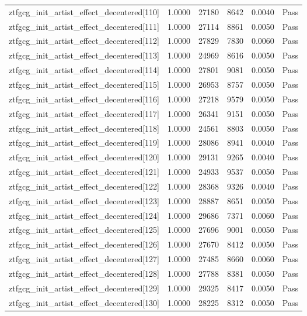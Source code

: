 \begin{table}[htbp]
\begin{tabular}{llrrll}
ztfgcg\_init\_artist\_effect\_decentered[110] & 1.0000 & 27180 & 8642 & 0.0040 & Pass \\
ztfgcg\_init\_artist\_effect\_decentered[111] & 1.0000 & 27114 & 8861 & 0.0050 & Pass \\
ztfgcg\_init\_artist\_effect\_decentered[112] & 1.0000 & 27829 & 7830 & 0.0060 & Pass \\
ztfgcg\_init\_artist\_effect\_decentered[113] & 1.0000 & 24969 & 8616 & 0.0050 & Pass \\
ztfgcg\_init\_artist\_effect\_decentered[114] & 1.0000 & 27801 & 9081 & 0.0050 & Pass \\
ztfgcg\_init\_artist\_effect\_decentered[115] & 1.0000 & 26953 & 8757 & 0.0050 & Pass \\
ztfgcg\_init\_artist\_effect\_decentered[116] & 1.0000 & 27218 & 9579 & 0.0050 & Pass \\
ztfgcg\_init\_artist\_effect\_decentered[117] & 1.0000 & 26341 & 9151 & 0.0050 & Pass \\
ztfgcg\_init\_artist\_effect\_decentered[118] & 1.0000 & 24561 & 8803 & 0.0050 & Pass \\
ztfgcg\_init\_artist\_effect\_decentered[119] & 1.0000 & 28086 & 8941 & 0.0040 & Pass \\
ztfgcg\_init\_artist\_effect\_decentered[120] & 1.0000 & 29131 & 9265 & 0.0040 & Pass \\
ztfgcg\_init\_artist\_effect\_decentered[121] & 1.0000 & 24933 & 9537 & 0.0050 & Pass \\
ztfgcg\_init\_artist\_effect\_decentered[122] & 1.0000 & 28368 & 9326 & 0.0040 & Pass \\
ztfgcg\_init\_artist\_effect\_decentered[123] & 1.0000 & 28887 & 8651 & 0.0050 & Pass \\
ztfgcg\_init\_artist\_effect\_decentered[124] & 1.0000 & 29686 & 7371 & 0.0060 & Pass \\
ztfgcg\_init\_artist\_effect\_decentered[125] & 1.0000 & 27696 & 9001 & 0.0050 & Pass \\
ztfgcg\_init\_artist\_effect\_decentered[126] & 1.0000 & 27670 & 8412 & 0.0050 & Pass \\
ztfgcg\_init\_artist\_effect\_decentered[127] & 1.0000 & 27485 & 8660 & 0.0060 & Pass \\
ztfgcg\_init\_artist\_effect\_decentered[128] & 1.0000 & 27788 & 8381 & 0.0050 & Pass \\
ztfgcg\_init\_artist\_effect\_decentered[129] & 1.0000 & 29325 & 8417 & 0.0050 & Pass \\
ztfgcg\_init\_artist\_effect\_decentered[130] & 1.0000 & 28225 & 8312 & 0.0050 & Pass \\

\end{tabular}
\end{table}

